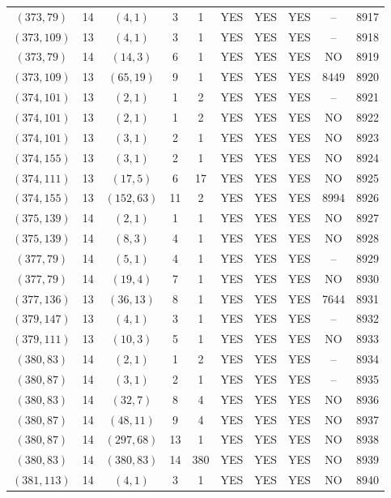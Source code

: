 \begin{longtable}{|c|c|c|c|c|c|c|c|c|c|}
$(373, 79)$ & 14 & $(4, 1)$ & 3 & 1 & YES & YES & YES & -- & 8917\\
$(373, 109)$ & 13 & $(4, 1)$ & 3 & 1 & YES & YES & YES & -- & 8918\\
$(373, 79)$ & 14 & $(14, 3)$ & 6 & 1 & YES & YES & YES & NO & 8919\\
$(373, 109)$ & 13 & $(65, 19)$ & 9 & 1 & YES & YES & YES & 8449 & 8920\\
$(374, 101)$ & 13 & $(2, 1)$ & 1 & 2 & YES & YES & YES & -- & 8921\\
$(374, 101)$ & 13 & $(2, 1)$ & 1 & 2 & YES & YES & YES & NO & 8922\\
$(374, 101)$ & 13 & $(3, 1)$ & 2 & 1 & YES & YES & YES & NO & 8923\\
$(374, 155)$ & 13 & $(3, 1)$ & 2 & 1 & YES & YES & YES & NO & 8924\\
$(374, 111)$ & 13 & $(17, 5)$ & 6 & 17 & YES & YES & YES & NO & 8925\\
$(374, 155)$ & 13 & $(152, 63)$ & 11 & 2 & YES & YES & YES & 8994 & 8926\\
$(375, 139)$ & 14 & $(2, 1)$ & 1 & 1 & YES & YES & YES & NO & 8927\\
$(375, 139)$ & 14 & $(8, 3)$ & 4 & 1 & YES & YES & YES & NO & 8928\\
$(377, 79)$ & 14 & $(5, 1)$ & 4 & 1 & YES & YES & YES & -- & 8929\\
$(377, 79)$ & 14 & $(19, 4)$ & 7 & 1 & YES & YES & YES & NO & 8930\\
$(377, 136)$ & 13 & $(36, 13)$ & 8 & 1 & YES & YES & YES & 7644 & 8931\\
$(379, 147)$ & 13 & $(4, 1)$ & 3 & 1 & YES & YES & YES & -- & 8932\\
$(379, 111)$ & 13 & $(10, 3)$ & 5 & 1 & YES & YES & YES & NO & 8933\\
$(380, 83)$ & 14 & $(2, 1)$ & 1 & 2 & YES & YES & YES & -- & 8934\\
$(380, 87)$ & 14 & $(3, 1)$ & 2 & 1 & YES & YES & YES & -- & 8935\\
$(380, 83)$ & 14 & $(32, 7)$ & 8 & 4 & YES & YES & YES & NO & 8936\\
$(380, 87)$ & 14 & $(48, 11)$ & 9 & 4 & YES & YES & YES & NO & 8937\\
$(380, 87)$ & 14 & $(297, 68)$ & 13 & 1 & YES & YES & YES & NO & 8938\\
$(380, 83)$ & 14 & $(380, 83)$ & 14 & 380 & YES & YES & YES & NO & 8939\\
$(381, 113)$ & 14 & $(4, 1)$ & 3 & 1 & YES & YES & YES & NO & 8940\\

\end{longtable}

